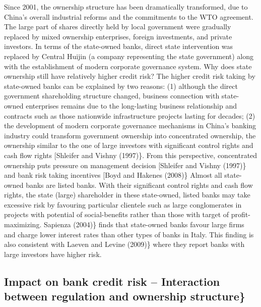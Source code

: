 \documentclass{article}
\begin{document}
Since 2001, the ownership structure has been dramatically transformed,
due to China's overall industrial reforms and the commitments to the WTO
agreement. The large part of shares directly held by local government
were gradually replaced by mixed ownership enterprises, foreign
investments, and private investors. In terms of the state-owned banks,
direct state intervention was replaced by Central Huijin (a company
representing the state government) along with the establishment of
modern corporate governance system. Why does state ownership still have
relatively higher credit risk? The higher credit risk taking by
state-owned banks can be explained by two reasons: (1) although the
direct government shareholding structure changed, business connection
with state-owned enterprises remains due to the long-lasting business
relationship and contracts such as those nationwide infrastructure
projects lasting for decades; (2) the development of modern corporate
governance mechanisms in China's banking industry could transform
government ownership into concentrated ownership, the ownership similar
to the one of large investors with significant control rights and cash
flow rights {[}Shleifer and Vishny (1997)\}. From this perspective,
concentrated ownership puts pressure on management decision {[}Shleifer
and Vishny (1997)\} and bank risk taking incentives {[}Boyd and Hakenes
(2008)\} Almost all state-owned banks are listed banks. With their
significant control rights and cash flow rights, the state (large)
shareholder in these state-owned, listed banks may take excessive risk
by favouring particular clientele such as large conglomerates in
projects with potential of social-benefits rather than those with target
of profit-maximizing. Sapienza (2004)\} finds that state-owned banks
favour large firms and charge lower interest rates than other types of
banks in Italy. This finding is also consistent with Laeven and Levine
(2009)\} where they report banks with large investors have higher risk.

\hypertarget{impact-on-bank-credit-risk-interaction-between-regulation-and-ownership-structure}{%
\subsection{Impact on bank credit risk -- Interaction between regulation
and ownership
structure\}}\label{impact-on-bank-credit-risk-interaction-between-regulation-and-ownership-structure}}
\end{document}
